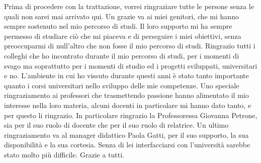 \thispagestyle{plain}

\vspace*{\fill}
Prima di procedere con la trattazione, vorrei ringraziare tutte le persone senza le quali non sarei mai arrivato qui.
Un grazie va ai miei genitori, che mi hanno sempre sostenuto nel mio percorso di studi. 
Il loro supporto mi ha sempre permesso di studiare ciò che mi piaceva e di perseguire i miei obiettivi, senza preoccuparmi di null'altro che non fosse il mio percorso di studi.
Ringrazio tutti i colleghi che ho incontrato durante il mio percorso di studi, per i momenti di svago ma soprattutto per i momenti di studio ed i progetti sviluppati, universitari e no.
L'ambiente in cui ho vissuto durante questi anni è stato tanto importante quanto i corsi universitari nello sviluppo delle mie competenze.
Uno speciale ringraziamento ai professori che trasmettendo passione hanno alimentato il mio interesse nella loro materia, alcuni docenti in particolare mi hanno dato tanto, e per questo li ringrazio.
In particolare ringrazio la Professoressa Giovanna Petrone, sia per il suo ruolo di docente che per il suo ruolo di relatrice. 
Un ultimo ringraziamento va al manager didattico Paola Gatti, per il suo supporto, la sua disponibilità e la sua cortesia. Senza di lei interfacciarsi con l'università sarebbe stato molto più difficile. 
Grazie a tutti.
\vspace*{\fill}